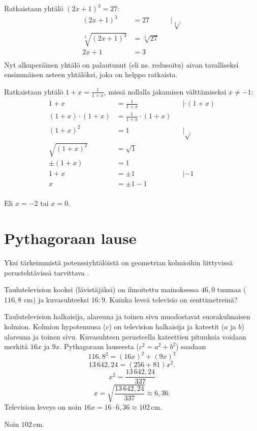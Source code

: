 \begin{esimerkki}
Ratkaistaan yhtälö $(2x+1)^3=27$:
	\begin{align*}
	(2x+1)^3&=27 &&|\sqrt[3]{} \\
	\sqrt[3]{(2x+1)^3}&=\sqrt[3]{27} \\
	2x+1&=3 \\
	\end{align*}
Nyt alkuperäinen yhtälö on palautunut (eli ns. redusoitu) aivan tavalliseksi ensimmäisen asteen yhtälöksi, joka on helppo ratkaista.
\end{esimerkki}

\begin{esimerkki}
Ratkaistaan yhtälö $1+x=\frac{1}{1+x}$, missä nollalla jakamisen välttämiseksi $x\neq-1$:
	\begin{align*}
	1+x&=\frac{1}{1+x} &&| \cdot(1+x) \\
	(1+x)\cdot(1+x)&=\frac{1}{1+x}\cdot(1+x) \\
	(1+x)^2&=1 && |\sqrt{ } \\
	\sqrt{(1+x)^2}&=\sqrt{1} &&\\
	\pm (1+x)&=1&& \\
	1+x &= \pm 1 &&|-1 \\
	x &=\pm 1 -1	 && \\
	\end{align*}

Eli $x=-2$ tai $x=0$.
\end{esimerkki}

\section*{Pythagoraan lause}

Yksi tärkeimmistä potenssiyhtälöistä on geometrian kolmioihin liittyvissä perustehtävissä tarvittava . %


\begin{esimerkki}
Taulutelevision kooksi (lävistäjäksi) on ilmoitettu mainoksessa $46,0$ tuumaa ($116,8$ cm) ja kuvasuhteeksi $16:9$. Kuinka leveä televisio on senttimetreinä?


\begin{esimratk}
Taulutelevision halkaisija, alareuna ja toinen sivu muodostavat suorakulmaisen kolmion. Kolmion hypotenuusa ($c$) on television halkaisija ja kateetit ($a$ ja $b$) alareuna ja toinen sivu. Kuvasuhteen perusteella kateettien pituuksia voidaan merkitä $16x$ ja $9x$. Pythagoraan lauseesta ($c^2 = a^2 + b^2$) saadaan
\[
116,8^2 = (16x)^2 + (9x)^2
\]
\[
13\,642,24 = (256+81)x^2.
\]
\[
x^2 = \frac{13\,642,24}{337}
\]
\[
x= \sqrt{\frac{13\,642,24}{337}} \approx 6,36.
\]
Television leveys on noin $16x = 16\cdot 6,36\approx 102$\,cm.
\end{esimratk}

\begin{esimvast}Noin $102$\,cm. \end{esimvast}
\end{esimerkki}

